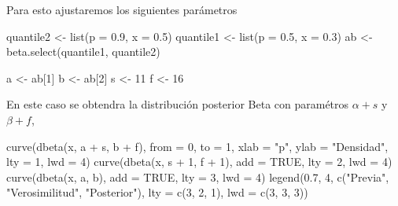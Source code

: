 \documentclass[
  12pt,
]{book}
\newenvironment{Shaded}{\begin{snugshade}}{\end{snugshade}}
\newcommand{\AttributeTok}[1]{\textcolor[rgb]{0.77,0.63,0.00}{#1}}
\newcommand{\ConstantTok}[1]{\textcolor[rgb]{0.00,0.00,0.00}{#1}}
\newcommand{\DecValTok}[1]{\textcolor[rgb]{0.00,0.00,0.81}{#1}}
\newcommand{\FloatTok}[1]{\textcolor[rgb]{0.00,0.00,0.81}{#1}}
\newcommand{\FunctionTok}[1]{\textcolor[rgb]{0.00,0.00,0.00}{#1}}
\newcommand{\NormalTok}[1]{#1}
\newcommand{\OtherTok}[1]{\textcolor[rgb]{0.56,0.35,0.01}{#1}}
\newcommand{\SpecialCharTok}[1]{\textcolor[rgb]{0.00,0.00,0.00}{#1}}
\newcommand{\StringTok}[1]{\textcolor[rgb]{0.31,0.60,0.02}{#1}}
\theoremstyle{definition}
\theoremstyle{definition}
\theoremstyle{definition}
\theoremstyle{remark}
\begin{document}
Para esto ajustaremos los siguientes parámetros

\begin{Shaded}
\begin{Highlighting}[]
\NormalTok{quantile2 }\OtherTok{\textless{}{-}} \FunctionTok{list}\NormalTok{(}\AttributeTok{p =} \FloatTok{0.9}\NormalTok{, }\AttributeTok{x =} \FloatTok{0.5}\NormalTok{)}
\NormalTok{quantile1 }\OtherTok{\textless{}{-}} \FunctionTok{list}\NormalTok{(}\AttributeTok{p =} \FloatTok{0.5}\NormalTok{, }\AttributeTok{x =} \FloatTok{0.3}\NormalTok{)}
\NormalTok{ab }\OtherTok{\textless{}{-}} \FunctionTok{beta.select}\NormalTok{(quantile1, quantile2)}

\NormalTok{a }\OtherTok{\textless{}{-}}\NormalTok{ ab[}\DecValTok{1}\NormalTok{]}
\NormalTok{b }\OtherTok{\textless{}{-}}\NormalTok{ ab[}\DecValTok{2}\NormalTok{]}
\NormalTok{s }\OtherTok{\textless{}{-}} \DecValTok{11}
\NormalTok{f }\OtherTok{\textless{}{-}} \DecValTok{16}
\end{Highlighting}
\end{Shaded}

En este caso se obtendra la distribución posterior Beta con paramétros
\(\alpha + s\) y \(\beta + f\),

\begin{Shaded}
\begin{Highlighting}[]
\FunctionTok{curve}\NormalTok{(}\FunctionTok{dbeta}\NormalTok{(x, a }\SpecialCharTok{+}\NormalTok{ s, b }\SpecialCharTok{+}\NormalTok{ f), }\AttributeTok{from =} \DecValTok{0}\NormalTok{, }\AttributeTok{to =} \DecValTok{1}\NormalTok{, }\AttributeTok{xlab =} \StringTok{"p"}\NormalTok{, }
    \AttributeTok{ylab =} \StringTok{"Densidad"}\NormalTok{, }\AttributeTok{lty =} \DecValTok{1}\NormalTok{, }\AttributeTok{lwd =} \DecValTok{4}\NormalTok{)}
\FunctionTok{curve}\NormalTok{(}\FunctionTok{dbeta}\NormalTok{(x, s }\SpecialCharTok{+} \DecValTok{1}\NormalTok{, f }\SpecialCharTok{+} \DecValTok{1}\NormalTok{), }\AttributeTok{add =} \ConstantTok{TRUE}\NormalTok{, }\AttributeTok{lty =} \DecValTok{2}\NormalTok{, }
    \AttributeTok{lwd =} \DecValTok{4}\NormalTok{)}
\FunctionTok{curve}\NormalTok{(}\FunctionTok{dbeta}\NormalTok{(x, a, b), }\AttributeTok{add =} \ConstantTok{TRUE}\NormalTok{, }\AttributeTok{lty =} \DecValTok{3}\NormalTok{, }\AttributeTok{lwd =} \DecValTok{4}\NormalTok{)}
\FunctionTok{legend}\NormalTok{(}\FloatTok{0.7}\NormalTok{, }\DecValTok{4}\NormalTok{, }\FunctionTok{c}\NormalTok{(}\StringTok{"Previa"}\NormalTok{, }\StringTok{"Verosimilitud"}\NormalTok{, }\StringTok{"Posterior"}\NormalTok{), }
    \AttributeTok{lty =} \FunctionTok{c}\NormalTok{(}\DecValTok{3}\NormalTok{, }\DecValTok{2}\NormalTok{, }\DecValTok{1}\NormalTok{), }\AttributeTok{lwd =} \FunctionTok{c}\NormalTok{(}\DecValTok{3}\NormalTok{, }\DecValTok{3}\NormalTok{, }\DecValTok{3}\NormalTok{))}
\end{Highlighting}
\end{Shaded}
\end{document}
